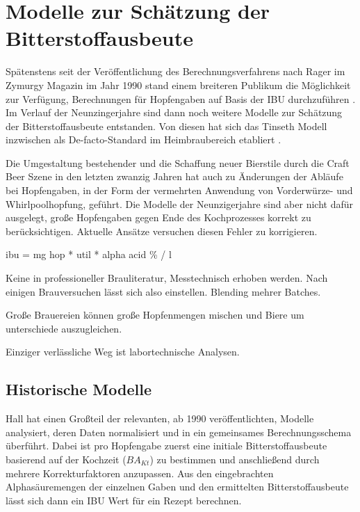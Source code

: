 \documentclass[a4paper,parskip=half]{scrartcl}
\newcommand{\BAKt}{{\mathit{BA}}_{\mathit{Kt}}}
\begin{document}

\section*{Modelle zur Schätzung der Bitterstoffausbeute}

Spätenstens seit der Veröffentlichung des Berechnungsverfahrens nach
Rager im Zymurgy Magazin im Jahr 1990 stand einem breiteren
Publikum die Möglichkeit zur Verfügung, Berechnungen für Hopfengaben auf
Basis der IBU
durchzuführen \parencite[59]{Hall1997}. Im Verlauf der Neunzingerjahre
sind dann noch weitere Modelle zur Schätzung der Bitterstoffausbeute entstanden.
Von diesen hat sich das Tinseth Modell inzwischen als De-facto-Standard im
Heimbraubereich etabliert \parencite[185]{Hieronymus2012}.

Die Umgestaltung bestehender und die Schaffung neuer Bierstile
durch die Craft Beer Szene in den letzten zwanzig Jahren hat auch zu Änderungen
der Abläufe bei Hopfengaben, in der Form der vermehrten Anwendung von Vorderwürze-
und Whirlpoolhopfung, geführt. Die Modelle der Neunzigerjahre sind aber
nicht dafür ausgelegt, große Hopfengaben gegen Ende des Kochprozesses korrekt
zu berücksichtigen. Aktuelle Ansätze versuchen diesen Fehler zu korrigieren.
\parencite[39]{Novotny2018}


\parencite[51]{Holle2010}
ibu = mg hop * util * alpha acid \% / l

\parencite[127]{Garetz1994} 
Keine in professioneller Brauliteratur, Messtechnisch erhoben
werden. Nach einigen Brauversuchen lässt sich also einstellen.
Blending mehrer Batches.

\parencite[76]{Daniels1996}
Große Brauereien können große Hopfenmengen mischen und
Biere um unterschiede auszugleichen.

\parencite[51]{Holle2010}
Einziger verlässliche Weg ist labortechnische Analysen.




\subsection*{Historische Modelle}

Hall hat einen Großteil der relevanten, ab 1990 veröffentlichten, Modelle analysiert,
deren Daten normalisiert und in ein gemeinsames Berechnungsschema überführt. Dabei ist
pro Hopfengabe zuerst eine initiale Bitterstoffausbeute basierend auf der Kochzeit
($\BAKt$) zu bestimmen und anschließend durch mehrere Korrekturfaktoren anzupassen.
Aus den eingebrachten Alphasäuremengen der einzelnen Gaben und den ermittelten
Bitterstoffausbeute lässt sich dann ein IBU Wert für ein Rezept berechnen. \parencite[59-65]{Hall1997}
\end{document}
